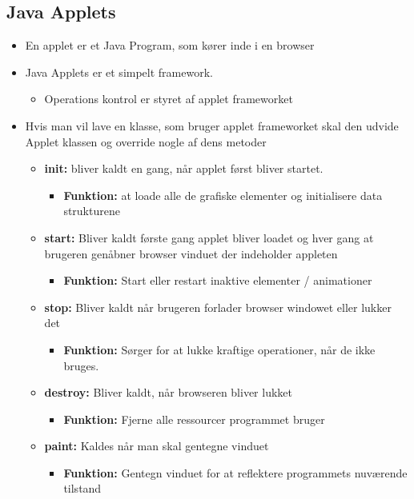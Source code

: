 \documentclass{article}
\begin{document}
\subsection{Java Applets}
\begin{itemize}
	\item En applet er et Java Program, som kører inde i en browser
	\item Java Applets er et simpelt framework.
	\begin{itemize}
		\item Operations kontrol er styret af applet frameworket 
	\end{itemize}
	\item Hvis man vil lave en klasse, som bruger applet frameworket skal den udvide Applet klassen og override nogle af dens metoder
	\begin{itemize}
		\item \textbf{init:} bliver kaldt en gang, når applet først bliver startet.  
		\begin{itemize}
			\item \textbf{Funktion:} at loade alle de grafiske elementer og initialisere data strukturene 
		\end{itemize}
		\item \textbf{start:} Bliver kaldt første gang applet bliver loadet og hver gang at brugeren genåbner browser vinduet der indeholder appleten
		\begin{itemize}
			\item \textbf{Funktion:} Start eller restart inaktive elementer / animationer
		\end{itemize}
		\item \textbf{stop:} Bliver kaldt når brugeren forlader browser windowet eller lukker det
		\begin{itemize}
			\item \textbf{Funktion:} Sørger for at lukke kraftige operationer, når de ikke bruges.
		\end{itemize}
		\item \textbf{destroy:} Bliver kaldt, når browseren bliver lukket
		\begin{itemize}
			\item \textbf{Funktion:} Fjerne alle ressourcer programmet bruger
		\end{itemize}
		\item \textbf{paint:} Kaldes når man skal gentegne vinduet
		\begin{itemize}
			\item \textbf{Funktion:} Gentegn vinduet for at reflektere programmets nuværende tilstand 

\end{itemize}
\end{itemize}
\end{itemize}
\end{document}

